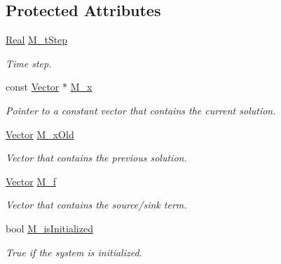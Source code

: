 \subsection*{Protected Attributes}
\begin{DoxyCompactItemize}
\item 
\hyperlink{namespaceFVCode3D_a40c1f5588a248569d80aa5f867080e83}{Real} \hyperlink{classFVCode3D_1_1DarcyPseudoSteady_3_01QRMatrix_00_01QRFracture_00_01MatrixType_00_01Implicit_01_4_ab26cff1a6ae988d44f437d290e29ed61}{M\+\_\+t\+Step}
\begin{DoxyCompactList}\small\item\em Time step. \end{DoxyCompactList}\item 
const \hyperlink{namespaceFVCode3D_a16ccf345652402bccd1a5d2e6782526c}{Vector} $\ast$ \hyperlink{classFVCode3D_1_1DarcyPseudoSteady_3_01QRMatrix_00_01QRFracture_00_01MatrixType_00_01Implicit_01_4_ac07a22b0b6f07aec3909b10924602ffc}{M\+\_\+x}
\begin{DoxyCompactList}\small\item\em Pointer to a constant vector that contains the current solution. \end{DoxyCompactList}\item 
\hyperlink{namespaceFVCode3D_a16ccf345652402bccd1a5d2e6782526c}{Vector} \hyperlink{classFVCode3D_1_1DarcyPseudoSteady_3_01QRMatrix_00_01QRFracture_00_01MatrixType_00_01Implicit_01_4_a09160731863ac36c2d6e6650a81a12e2}{M\+\_\+x\+Old}
\begin{DoxyCompactList}\small\item\em Vector that contains the previous solution. \end{DoxyCompactList}\item 
\hyperlink{namespaceFVCode3D_a16ccf345652402bccd1a5d2e6782526c}{Vector} \hyperlink{classFVCode3D_1_1DarcyPseudoSteady_3_01QRMatrix_00_01QRFracture_00_01MatrixType_00_01Implicit_01_4_a703f94eafbdd6687cb111e17d1f88a0c}{M\+\_\+f}
\begin{DoxyCompactList}\small\item\em Vector that contains the source/sink term. \end{DoxyCompactList}\item 
bool \hyperlink{classFVCode3D_1_1DarcyPseudoSteady_3_01QRMatrix_00_01QRFracture_00_01MatrixType_00_01Implicit_01_4_a298983a6d466bf5906abf47e4199cb79}{M\+\_\+is\+Initialized}
\begin{DoxyCompactList}\small\item\em True if the system is initialized. \end{DoxyCompactList}\item 

\end{DoxyCompactItemize}
